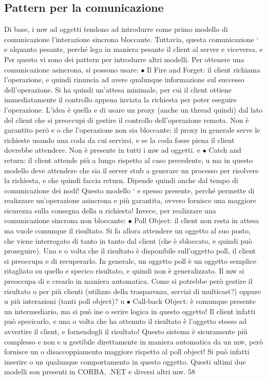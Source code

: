 \documentclass[a4paper,12pt]{article}
\begin{document}
\subsection{Pattern per la comunicazione}
Di base, i mw ad oggetti tendono ad introdurre come primo modello di comunicazione l'interazione sincrona bloccante.
Tuttavia, questa comunicazione `
e
alquanto pesante, perché lega in maniera pesante il client al server e viceversa.
e
Per questo vi sono dei pattern per introdurre altri modelli.
Per ottenere una comunicazione asincrona, si possono usare:
$\bullet$ Il Fire and Forget: il client richiama l'operazione, e quindi rinuncia ad
avere qualunque informazione sul successo dell'operazione. Si ha quindi
un'attesa minimale, per cui il client ottiene immediatamente il controllo
appena inviata la richiesta per poter eseguire l'operazione. L'idea è quella
e
di usare un proxy (anche un thread quindi) dal lato del client che si preoccupi di gestire il controllo dell'operazione
remota. Non è garantito però
e
o
che l'operazione non sia bloccante: il proxy in generale serve le richieste
usando una coda da cui servirsi, e se la coda fosse piena il client dovrebbe
attendere. Non è presente in tutti i mw ad oggetti.
e
$\bullet$ Catch and return: il client attende più a lungo rispetto al caso precedente,
u
ma in questo modello deve attendere che sia il server stub a generare un
processo per risolvere la richiesta, e che quindi faccia return. Dipende
quindi anche dal tempo di comunicazione dei nodi! Questo modello `
e
spesso presente, perché permette di realizzare un'operazione asincrona
e
più garantita, ovvero fornisce una maggiore sicurezza sulla consegna della
u
richiesta!
Invece, per realizzare una comunicazione sincrona non bloccante:
$\bullet$ Poll Object: il client non resta in attesa ma vuole comunque il risultato.
Si fa allora attendere un oggetto al suo posto, che viene interrogato di
tanto in tanto dal client (che è sbloccato, e quindi può proseguire). Una
e
o
volta che il risultato è disponibile sull'oggetto poll, il client si preoccupa
e
di recuperarlo.
In generale, un oggetto poll è un oggetto semplice ritagliato su quello
e
specico risultato, e quindi non è generalizzato. Il mw si preoccupa di
e
crearlo in maniera automatica. Come si potrebbe però gestire il risultato
o
per più clienti (utilizzo della trasparenza, servizi di multicast?) oppure
u
più interazioni (tanti poll object)?
u
$\bullet$ Call-back Object: è comunque presente un intermediario, ma si può ine
o
serire logica in questo oggetto! Il client infatti può specicarlo, e una
o
volta che ha ottenuto il risultato è l'oggetto stesso ad avvertire il client,
e
fornendogli il risultato! Questo sistema è sicuramente più complesso e non
e
u
gestibile direttamente in maniera automatica da un mw, però fornisce un
o
disaccoppiamento maggiore rispetto al poll object! Si può infatti inserire
o
un qualunque comportamento in questo oggetto.
Questi ultimi due modelli son presenti in CORBA, .NET e diversi altri mw.
58
\end{document}
